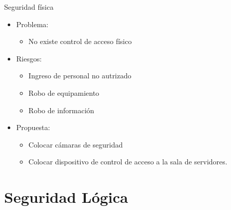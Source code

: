 \documentclass[spanish]{beamer}
\begin{document}
\begin{frame}{Seguridad física}
  \begin{itemize}
  \item Problema:
    \begin{itemize}
    \item No existe control de acceso físico
    \end{itemize}
  \item Riesgos:
    \begin{itemize}
    \item Ingreso de personal no autrizado
    \item Robo de equipamiento
    \item Robo de información
    \end{itemize}
  \item Propuesta:
    \begin{itemize}
    \item Colocar cámaras de seguridad
    \item Colocar dispositivo de control de acceso a la sala de
      servidores.
    \end{itemize}
  \end{itemize}
\end{frame}


\section{Seguridad Lógica}
\end{document}

